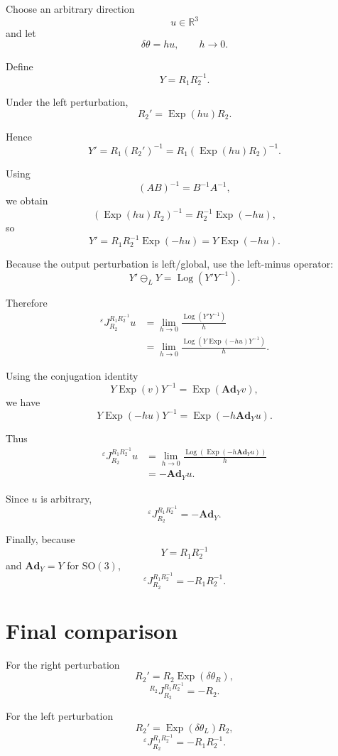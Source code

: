 \documentclass[11pt]{article}
\newcommand{\Exp}{\operatorname{Exp}}
\newcommand{\Log}{\operatorname{Log}}
\newcommand{\SO}{\mathrm{SO}}
\newcommand{\Ad}{\mathbf{Ad}}
\newcommand{\R}{\mathbb{R}}
\begin{document}
Choose an arbitrary direction
\[
u\in\R^3
\]
and let
\[
\delta\theta=hu,
\qquad h\to0.
\]

Define
\[
Y=R_1R_2^{-1}.
\]

Under the left perturbation,
\[
R_2'=\Exp(hu)R_2.
\]

Hence
\[
Y'
=
R_1(R_2')^{-1}
=
R_1(\Exp(hu)R_2)^{-1}.
\]

Using
\[
(AB)^{-1}=B^{-1}A^{-1},
\]
we obtain
\[
(\Exp(hu)R_2)^{-1}
=
R_2^{-1}\Exp(-hu),
\]
so
\[
\boxed{
Y'
=
R_1R_2^{-1}\Exp(-hu)
=
Y\Exp(-hu).
}
\]

Because the output perturbation is left/global, use the left-minus
operator:
\[
Y'\ominus_LY
=
\Log(Y'Y^{-1}).
\]

Therefore
\begin{align}
{}^{\varepsilon}J_{R_2}^{R_1R_2^{-1}}u
&=
\lim_{h\to0}
\frac{
\Log(Y'Y^{-1})
}{h}
\\
&=
\lim_{h\to0}
\frac{
\Log\!\left(
Y\Exp(-hu)Y^{-1}
\right)
}{h}.
\end{align}

Using the conjugation identity
\[
Y\Exp(v)Y^{-1}
=
\Exp(\Ad_Yv),
\]
we have
\[
Y\Exp(-hu)Y^{-1}
=
\Exp(-h\Ad_Yu).
\]

Thus
\begin{align}
{}^{\varepsilon}J_{R_2}^{R_1R_2^{-1}}u
&=
\lim_{h\to0}
\frac{
\Log\!\left(
\Exp(-h\Ad_Yu)
\right)
}{h}
\\
&=
-\Ad_Yu.
\end{align}

Since $u$ is arbitrary,
\[
{}^{\varepsilon}J_{R_2}^{R_1R_2^{-1}}
=
-\Ad_Y.
\]

Finally, because
\[
Y=R_1R_2^{-1}
\]
and $\Ad_Y=Y$ for $\SO(3)$,
\[
\boxed{
{}^{\varepsilon}J_{R_2}^{R_1R_2^{-1}}
=
-R_1R_2^{-1}.
}
\]

\section*{Final comparison}

For the right perturbation
\[
R_2'=R_2\Exp(\delta\theta_R),
\]
\[
\boxed{
{}^{R_2}J_{R_2}^{R_1R_2^{-1}}
=
-R_2.
}
\]

For the left perturbation
\[
R_2'=\Exp(\delta\theta_L)R_2,
\]
\[
\boxed{
{}^{\varepsilon}J_{R_2}^{R_1R_2^{-1}}
=
-R_1R_2^{-1}.
}
\]
\end{document}
